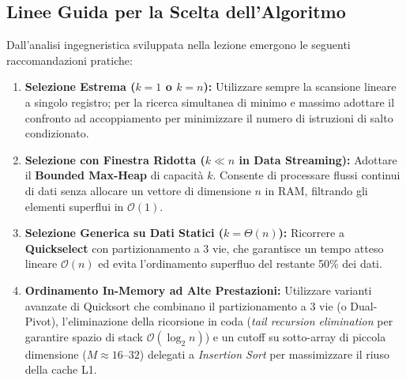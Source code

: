 \subsection{Linee Guida per la Scelta dell'Algoritmo}
Dall'analisi ingegneristica sviluppata nella lezione emergono le seguenti raccomandazioni pratiche:
\begin{enumerate}
  \item \textbf{Selezione Estrema ($k = 1$ o $k = n$):} Utilizzare sempre la scansione lineare a singolo registro; per la ricerca simultanea di minimo e massimo adottare il confronto ad accoppiamento per minimizzare il numero di istruzioni di salto condizionato.
  \item \textbf{Selezione con Finestra Ridotta ($k \ll n$ in Data Streaming):} Adottare il \textbf{Bounded Max-Heap} di capacità $k$. Consente di processare flussi continui di dati senza allocare un vettore di dimensione $n$ in RAM, filtrando gli elementi superflui in $\mathcal{O}(1)$.
  \item \textbf{Selezione Generica su Dati Statici ($k = \Theta(n)$):} Ricorrere a \textbf{Quickselect} con partizionamento a 3 vie, che garantisce un tempo atteso lineare $\mathcal{O}(n)$ ed evita l'ordinamento superfluo del restante 50\% dei dati.
  \item \textbf{Ordinamento In-Memory ad Alte Prestazioni:} Utilizzare varianti avanzate di Quicksort che combinano il partizionamento a 3 vie (o Dual-Pivot), l'eliminazione della ricorsione in coda (\textit{tail recursion elimination} per garantire spazio di stack $\mathcal{O}(\log_2 n)$) e un cutoff su sotto-array di piccola dimensione ($M \approx 16$--$32$) delegati a \textit{Insertion Sort} per massimizzare il riuso della cache L1.
\end{enumerate}
